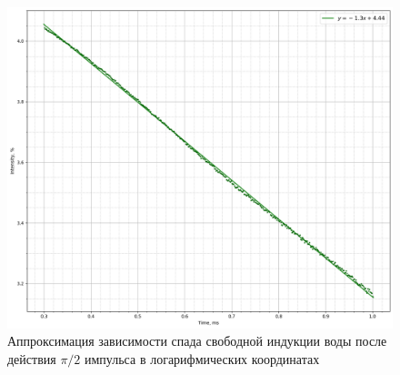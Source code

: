\documentclass{article}
\begin{document}
\begin{itemize}
\begin{figure}[h!]
    \centering
    \includegraphics[scale = 0.3]{graphs/h2o_t2_selected_app.png}
    \caption{Аппроксимация зависимости спада свободной индукции воды после действия $\pi/2$ импульса в логарифмических координатах}
    \label{h2o_t2_selected_log}
\end{figure}


\end{itemize}
\end{document}
